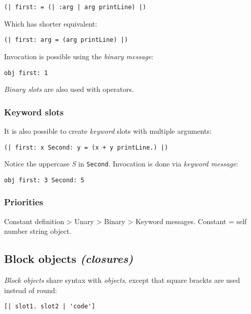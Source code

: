 \documentclass[10pt]{article}
\begin{document}
\begin{multicols*}{3}
\begin{lstlisting}
(| first: = (| :arg | arg printLine) |)
\end{lstlisting}

Which has shorter equivalent:

\begin{lstlisting}
(| first: arg = (arg printLine) |)
\end{lstlisting}

Invocation is possible using the \textit{binary message}:

\begin{lstlisting}
obj first: 1
\end{lstlisting}

\textit{Binary slots} are also used with operators.



\subsubsection{Keyword slots}
It is also possible to create \textit{keyword} slots with multiple arguments:

\begin{lstlisting}
(| first: x Second: y = (x + y printLine.) |)
\end{lstlisting}

Notice the uppercase \textit{S} in \texttt{Second}. Invocation is done via \textit{keyword message}:

\begin{lstlisting}
obj first: 3 Second: 5
\end{lstlisting}




\subsubsection{Priorities}

Constant definition \textgreater{} Unary \textgreater{} Binary \textgreater{} Keyword messages. Constant = self \textbar{} number \textbar{} string \textbar{} object.


\subsection{Block objects \textit{(closures)}}
\textit{Block objects} share syntax with \textit{objects}, except that square brackts are used instead of round:

\begin{lstlisting}
[| slot1. slot2 | 'code']
\end{lstlisting}


\end{multicols*}
\end{document}
